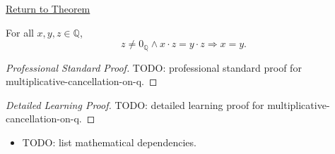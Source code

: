 \newpage
{}
\label{prf:multiplicative-cancellation-on-q}

\begin{remark*}[Return]
\hyperref[cor:multiplicative-cancellation-on-q]{Return to Theorem}
\end{remark*}

\begin{corollary*}
For all $x,y,z\in\mathbb{Q}$,
\[
z\ne 0_{\mathbb{Q}}\land x\cdot z=y\cdot z
\Longrightarrow
x=y.
\]
\end{corollary*}

\begin{proof}[Professional Standard Proof]
\LRAProofBodyStart
TODO: professional standard proof for multiplicative-cancellation-on-q.
\end{proof}

\begin{proof}[Detailed Learning Proof]
\LRAProofBodyStart
TODO: detailed learning proof for multiplicative-cancellation-on-q.
\end{proof}

\begin{remark*}
\end{remark*}

\begin{dependencies}
\begin{itemize}
  \item TODO: list mathematical dependencies.
\end{itemize}
\end{dependencies}

\clearpage
